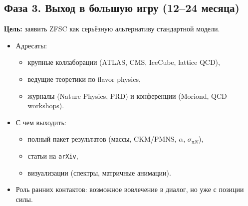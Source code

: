 \documentclass[a4paper,12pt]{article}
\begin{document}
\subsection*{Фаза 3. Выход в большую игру (12--24 месяца)}
\textbf{Цель:} заявить ZFSC как серьёзную альтернативу стандартной модели.
\begin{itemize}
  \item Адресаты:
    \begin{itemize}
      \item крупные коллаборации (ATLAS, CMS, IceCube, lattice QCD),
      \item ведущие теоретики по flavor physics,
      \item журналы (Nature Physics, PRD) и конференции (Moriond, QCD workshops).
    \end{itemize}
  \item С чем выходить:
    \begin{itemize}
      \item полный пакет результатов (массы, CKM/PMNS, $\alpha$, $\sigma_{\pi N}$),
      \item статьи на \texttt{arXiv},
      \item визуализации (спектры, матричные анимации).
    \end{itemize}
  \item Роль ранних контактов: возможное вовлечение в диалог, но уже с позиции силы.
\end{itemize}
\end{document}
